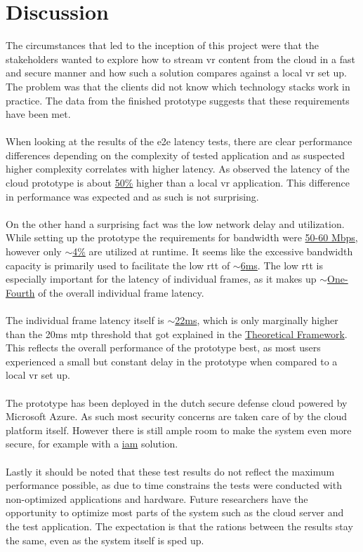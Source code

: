 \section{Discussion}

The circumstances that led to the inception of this project were that the stakeholders wanted to explore how to stream \acrshort{vr} content from the cloud in a fast and secure manner and how such a solution compares against a local \acrshort{vr} set up. The problem was that the clients did not know which technology stacks work in practice. The data from the finished prototype suggests that these requirements have been met.
\\ \\
When looking at the results of the \acrfull{e2e} latency tests, there are clear performance differences depending on the complexity of tested application and as suspected higher complexity correlates with higher latency. As observed the latency of the cloud prototype is about \hyperref[sec:res:t1]{50\%} higher than a local \acrshort{vr} application. This difference in performance was expected and as such is not surprising.
\\ \\
On the other hand a surprising fact was the low network delay and utilization. While setting up the prototype the requirements for bandwidth were \hyperref[sec:res:t4]{50-60 Mbps}, however only \hyperref[sec:res:t1]{$\sim$4\%} are utilized at runtime. It seems like the excessive bandwidth capacity is primarily used to facilitate the low \acrfull{rtt} of \hyperref[sec:res:t2]{$\sim$6\acrshort{ms}}. The low \acrshort{rtt} is especially important for the latency of individual frames, as it makes up \hyperref[sec:res:t1]{$\sim$One-Fourth} of the overall individual frame latency.
\\ \\
The individual frame latency itself is \hyperref[sec:res:t3]{$\sim$22\acrshort{ms}}, which is only marginally higher than the 20\acrshort{ms} \acrshort{mtp} threshold that got explained in the \hyperref[sec:theo]{Theoretical Framework}. This reflects the overall performance of the prototype best, as most users experienced a small but constant delay in the prototype when compared to a local \acrshort{vr} set up.
\\ \\
The prototype has been deployed in the dutch secure defense cloud powered by Microsoft Azure. As such most security concerns are taken care of by the cloud platform itself. However there is still ample room to make the system even more secure, for example with a \hyperref[sec:theo:iam]{\acrfull{iam}} solution.
\\ \\
Lastly it should be noted that these test results do not reflect the maximum performance possible, as due to time constrains the tests were conducted with non-optimized applications and hardware. Future researchers have the opportunity to optimize most parts of  the system such as the cloud server and the test application. The expectation is that the rations between the results stay the same, even as the system itself is sped up.